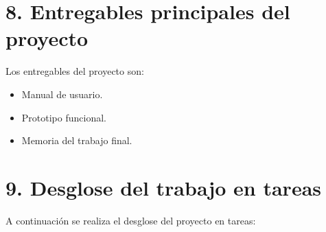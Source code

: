 \documentclass[
11pt, %
]{charter}
\begin{document}

\section{8. Entregables principales del proyecto}
\label{sec:entregables}

Los entregables del proyecto son:

\begin{itemize}
	\item Manual de usuario.
	\item Prototipo funcional.
	\item Memoria del trabajo final.
\end{itemize}

\section{9. Desglose del trabajo en tareas}
\label{sec:wbs}


A continuación se realiza el desglose del proyecto en tareas:
\end{document}
